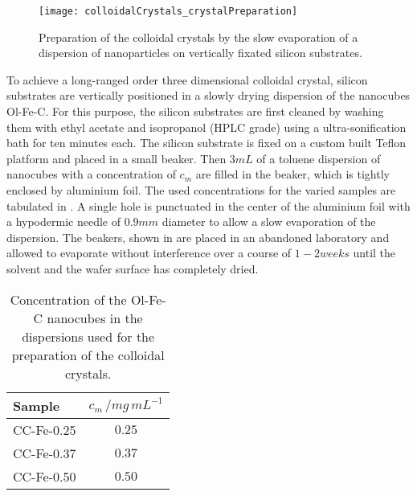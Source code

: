 \documentclass[\main/dresen_thesis.tex]{subfiles}
\begin{document}
  \begin{figure}[tb]
    \centering
    \texttt{[image: colloidalCrystals\_crystalPreparation]}
    \caption{\label{fig:colloidalCrystals:preparation:image}Preparation of the colloidal crystals by the slow evaporation of a dispersion of nanoparticles on vertically fixated silicon substrates.}
  \end{figure}

  To achieve a long-ranged order three dimensional colloidal crystal, silicon substrates are vertically positioned in a slowly drying dispersion of the nanocubes Ol-Fe-C.
  For this purpose, the silicon substrates are first cleaned by washing them with ethyl acetate and isopropanol (HPLC grade) using a ultra-sonification bath for ten minutes each.
  The silicon substrate is fixed on a custom built Teflon platform and placed in a small beaker.
  Then $3 \unit{mL}$ of a toluene dispersion of nanocubes with a concentration of $c_m$ are filled in the beaker, which is tightly enclosed by aluminium foil.
  The used concentrations for the varied samples are tabulated in .
  A single hole is punctuated in the center of the aluminium foil with a hypodermic needle of $0.9 \unit{mm}$ diameter to allow a slow evaporation of the dispersion.
  The beakers, shown in  are placed in an abandoned laboratory and allowed to evaporate without interference over a course of $1 - 2 \unit{weeks}$ until the solvent and the wafer surface has completely dried.

  \begin{table}[!htbp]
    \centering
    \caption{\label{tab:colloidalCrystals:preparation:conditions} Concentration of the Ol-Fe-C nanocubes in the dispersions used for the preparation of the colloidal crystals.}
    \begin{tabular}{ l | c }
      \textbf{Sample}               & $c_m \, /  \unit{mg \, mL^{-1}}$\\
      \hline
      \rule{0pt}{2ex} CC-Fe-0.25    & $0.25$\\
      \rule{0pt}{2ex} CC-Fe-0.37    & $0.37$\\
      \rule{0pt}{2ex} CC-Fe-0.50    & $0.50$\\
      \hline
    \end{tabular}
  \end{table}
\end{document}
